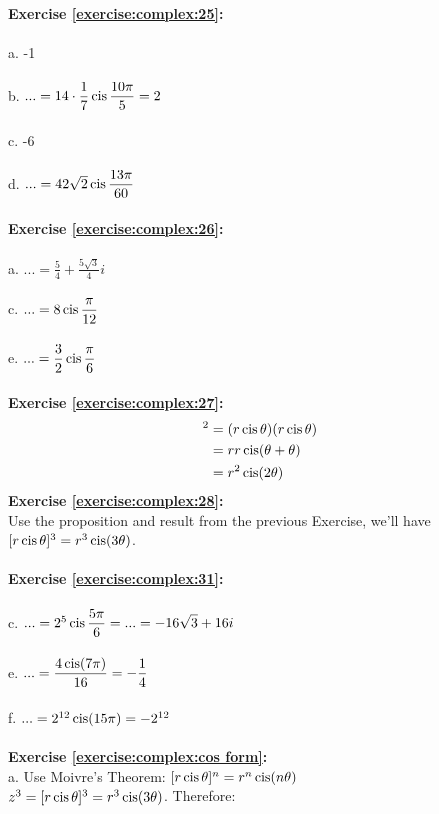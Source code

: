 \\
\textbf{Exercise \ref{exercise:complex:25}:}\\
\\
a. -1\\
\\
b. $...=14\cdot \displaystyle\frac{1}{7}\operatorname{cis}\frac{10\pi}{5}=2$\\
\\
c. -6\\
\\
d. $...=42\sqrt{2}\operatorname{cis}\displaystyle\frac{13\pi}{60}$\\
\\
\textbf{Exercise \ref{exercise:complex:26}:}\\
\\
a. $...=\displaystyle\frac{5}{4}+\frac{5\sqrt{3}}{4}i$\\
\\
c. $...=8\operatorname{cis}\displaystyle\frac{\pi}{12}$\\
\\
e. $...=\displaystyle\frac{3}{2}\operatorname{cis}\displaystyle\frac{\pi}{6}$\\
\\
\textbf{Exercise \ref{exercise:complex:27}:}
\begin{align*}
[r\cis\theta]^{2} & = (r\cis\theta)(r\cis\theta)\\
& = rr\cis(\theta+\theta)\\
& = r^{2}\cis(2\theta)\\
\end{align*}
\textbf{Exercise \ref{exercise:complex:28}:}\\
Use the proposition and result from the previous Exercise, we'll have $[r\operatorname{cis}\theta]^{3}=r^{3}\operatorname{cis}(3\theta)$.\\
\\
\textbf{Exercise \ref{exercise:complex:31}:}\\
\\
c. $...=2^{5}\operatorname{cis}\displaystyle\frac{5\pi}{6}=...=-16\sqrt{3}+16i$\\
\\
e. $...=\displaystyle\frac{4\operatorname{cis}(7\pi)}{16}=-\frac{1}{4}$\\
\\
f. $...=2^{12}\operatorname{cis}(15\pi)=-2^{12}$\\
\\
\textbf{Exercise \ref{exercise:complex:cos form}:}\\
a. Use Moivre's Theorem: $[r\operatorname{cis}\theta]^{n}=r^{n}\operatorname{cis}(n\theta)$\\
$z^{3}=[r\operatorname{cis}\theta]^{3}=r^{3}\operatorname{cis}(3\theta)$. Therefore:
